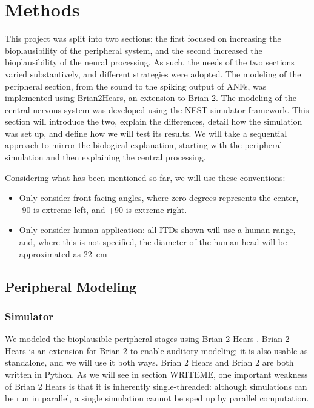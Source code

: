 \documentclass[11pt,a4paper]{article}
\newcommand{\parspace}{\vspace{7pt}}
\begin{document}
\section{Methods}
This project was split into two sections: the first focused on increasing the bioplausibility of the peripheral system, and the second increased the bioplausibility of the neural processing. As such, the needs of the two sections varied substantively, and different strategies were adopted. The modeling of the peripheral section, from the sound to the spiking output of ANFs, was implemented using Brian2Hears, an extension to Brian 2. The modeling of the central nervous system was developed using the NEST simulator framework. This section will introduce the two, explain the differences, detail how the simulation was set up, and define how we will test its results. We will take a sequential approach to mirror the biological explanation, starting with the peripheral simulation and then explaining the central processing.

\parspace
Considering what has been mentioned so far, we will use these conventions:
\begin{itemize}
    \item Only consider front-facing angles, where zero degrees represents the center, -90 is extreme left, and +90 is extreme right.
    \item Only consider human application: all ITDs shown will use a human range, and, where this is not specified, the diameter of the human head will be approximated as \qty{22}{\centi\meter}
\end{itemize} 

\subsection{Peripheral Modeling}
\subsubsection{Simulator}
We modeled the bioplausible peripheral stages using Brian 2 Hears \cite{fontaineBrianHearsOnline2011}. Brian 2 Hears is an extension for Brian 2 \cite{stimbergBrian2Intuitive2019} to enable auditory modeling; it is also usable as standalone, and we will use it both ways. Brian 2 Hears and Brian 2 are both written in Python. As we will see in section WRITEME, one important weakness of Brian 2 Hears is that it is inherently single-threaded: although simulations can be run in parallel, a single simulation cannot be sped up by parallel computation.
\end{document}
